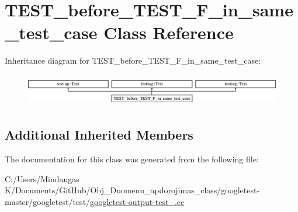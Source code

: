 \hypertarget{class_t_e_s_t__before___t_e_s_t___f__in__same__test__case}{}\section{T\+E\+S\+T\+\_\+before\+\_\+\+T\+E\+S\+T\+\_\+\+F\+\_\+in\+\_\+same\+\_\+test\+\_\+case Class Reference}
\label{class_t_e_s_t__before___t_e_s_t___f__in__same__test__case}
Inheritance diagram for T\+E\+S\+T\+\_\+before\+\_\+\+T\+E\+S\+T\+\_\+\+F\+\_\+in\+\_\+same\+\_\+test\+\_\+case\+:\begin{figure}[H]
\begin{center}
\leavevmode
\includegraphics[height=1.441442cm]{d6/da6/class_t_e_s_t__before___t_e_s_t___f__in__same__test__case}
\end{center}
\end{figure}
\subsection*{Additional Inherited Members}


The documentation for this class was generated from the following file\+:\begin{DoxyCompactItemize}
\item 
C\+:/\+Users/\+Mindaugas K/\+Documents/\+Git\+Hub/\+Obj\+\_\+\+Duomenu\+\_\+apdorojimas\+\_\+class/googletest-\/master/googletest/test/\mbox{\hyperlink{googletest-master_2googletest_2test_2googletest-output-test___8cc}{googletest-\/output-\/test\+\_\+.\+cc}}\end{DoxyCompactItemize}
